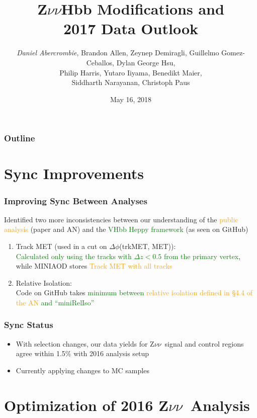 \documentclass{beamer}
\author[D. Abercrombie]{
  \emph{Daniel Abercrombie}, Brandon Allen, Zeynep Demiragli,
  Guillelmo Gomez-Ceballos, Dylan George Hsu, \\
  Philip Harris, Yutaro Iiyama, Benedikt Maier, \\
  Siddharth Narayanan, Christoph Paus
}
\title{\bf \sffamily Z$\nu\nu$Hbb Modifications and \\ 2017 Data Outlook}
\date{May 16, 2018}
\newcommand{\Znn}{Z$\nu\nu$~}
\begin{document}
\begin{frame}[nonumbering]
  \titlepage
\end{frame}

\begin{frame}
  \frametitle{Outline}
  \tableofcontents
\end{frame}

\section{Sync Improvements}

\begin{frame}
  \frametitle{Improving Sync Between Analyses}

  Identified two more inconsistencies between our understanding of the
  \textcolor{orange}{public analysis}
  (paper and AN) and the \textcolor{green}{VHbb Heppy framework} (as seen on GitHub)

  \begin{enumerate}
  \item Track MET (used in a cut on $\Delta\phi$(trkMET, MET)): \\
    \textcolor{green}
              {Calculated only using the tracks with $\Delta z < 0.5$ from the primary vertex},
    while MINIAOD stores \textcolor{orange}{Track MET with all tracks}
  \item Relative Isolation: \\
    Code on GitHub takes \textcolor{green}{minimum between}
    \textcolor{orange}{relative isolation defined in \S4.4 of the AN}
    \textcolor{green}{and ``miniRelIso''}
  \end{enumerate}

\end{frame}

\begin{frame}
  \frametitle{Sync Status}

  \begin{itemize}
  \item With selection changes, our data yields for \Znn signal and
    control regions agree within 1.5\% with 2016 analysis setup
  \item Currently applying changes to MC samples
  \end{itemize}

\end{frame}

\section{Optimization of 2016 \Znn Analysis}
\end{document}
